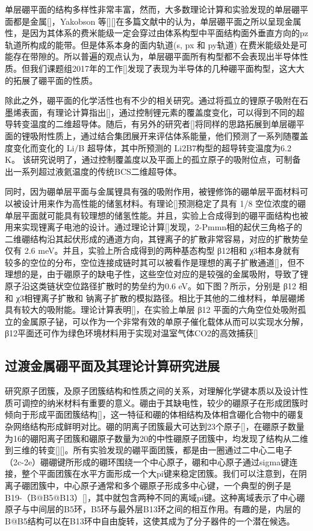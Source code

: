 \documentclass[phd,nobackinfo]{scutthesis}
\begin{document}
单层硼平面的结构多样性非常丰富，然而，大多数理论计算和实验发现的单层硼平面都是金属[]，Yakobson 等[][]在多篇文献中的认为，单层硼平面之所以呈现金属性，是因为其体系的费米能级一定会穿过由体系构型中平面结构面外垂直方向的pz 轨道所构成的能带。但是体系本身的面内轨道(s, px 和 py轨道) 在费米能级处是可能存在带隙的。所以普遍的观点认为，单层硼平面所有构型都不会表现出半导体性质。但我们课题组2017年的工作[]发现了表现为半导体的几种硼平面构型，这大大的拓展了硼平面的性质。

除此之外，硼平面的化学活性也有不少的相关研究。通过将孤立的锂原子吸附在石墨烯表面，有理论计算指出[]，通过控制锂元素的覆盖度变化，可以得到不同的超导转变温度的二维超导体。随后，有另外的研究者[]将同样的思路拓展到单层硼平面的锂吸附性质上，通过结合集团展开来评估体系能量，他们预测了一系列随覆盖度变化而变化的 Li/B 超导体，其中所预测的 Li2B7构型的超导转变温度为6.2 K。 该研究说明了，通过控制覆盖度以及平面上的孤立原子的吸附位点，可制备出一系列超过液氦温度的传统BCS二维超导体。

同时，因为硼单层平面与金属锂具有强的吸附作用，被锂修饰的硼单层平面材料可以被设计用来作为高性能的储氢材料。有理论[]预测稳定了具有 1/8 空位浓度的硼单层平面就可能具有较理想的储氢性能。并且，实验上合成得到的硼平面结构也被用来实现锂离子电池的设计。通过理论计算[]发现，2-Pmmn相的起伏三角格子的二维硼结构沿其起伏形成的通道方向，其锂离子的扩散非常容易，对应的扩散势垒仅有 2.6 meV。并且，实验上所合成得到的两种基态构型 β12相和 χ3相本身就有较多的空位的分布，空位连接成链时其可以被看作是理想的离子扩散通道[]，但不理想的是，由于硼原子的缺电子性，这些空位对应的是较强的金属吸附，导致了锂原子沿这类链状空位路径扩散时的势垒约为0.6 eV。如下图？所示，分别是 β12 相和 χ3相锂离子扩散和 钠离子扩散的模拟路径。相比于其他的二维材料，单层硼烯具有较大的吸附能。理论计算表明[]，在实验上单层 β12 平面的六角空位处吸附孤立的金属原子铋，可以作为一个非常有效的单原子催化载体从而可以实现水分解，β12平面还可作为绿色环境材料用于实现对温室气体CO2的高效捕获[]

\subsection{过渡金属硼平面及其理论计算研究进展}
研究原子团簇，及原子团簇结构和性质之间的关系，对理解化学键本质以及设计性质可调控的纳米材料有重要的意义。硼由于其缺电性，较少的硼原子在形成团簇时倾向于形成平面团簇结构[]，这一特征和硼的体相结构及体相含硼化合物中的硼复杂网络结构形成鲜明对比。硼的阴离子团簇最大可达到23个原子[]，在硼原子数量为16的硼阳离子团簇和硼原子数量为20的中性硼原子团簇中，均发现了结构从二维到三维的转变[][]。所有实验发现的硼平面团簇，都是由一圈通过二中心二电子（2c-2e）硼硼键所形成的硼环围绕一个中心原子，硼和中心原子通过sigma键连接，整个平面团簇在水平方面形成一个大pi键来稳定团簇。我们可以注意到，在阴离子硼团簇中，中心原子通常和多个硼原子形成多中心键，一个典型的例子是B19-（B@B5@B13）[]，其中就包含两种不同的离域pi键。这种离域表示了中心硼原子与中间层的B5环，B5环与最外层B13环之间的相互作用。有趣的是，内层的B@B5结构可以在B13环中自由旋转，这使其成为了分子器件的一个潜在候选。
\end{document}
